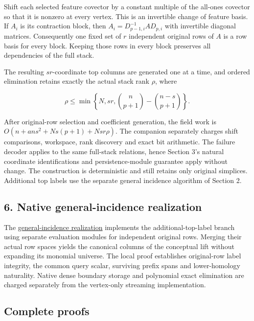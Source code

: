 Shift each selected feature covector by a constant multiple of the all-ones covector so that it is nonzero at every vertex. This is an invertible change of feature basis. If \(A_i\) is its contraction block, then \(A_i=D_{p-1,i}^{-1}AD_{p,i}\) with invertible diagonal matrices. Consequently one fixed set of \(r\) independent original rows of \(A\) is a row basis for every block. Keeping those rows in every block preserves all dependencies of the full stack.

The resulting \(sr\)-coordinate top columns are generated one at a time, and ordered elimination retains exactly the actual stack rank \(\rho\), where

\[
\rho\leq\min\left\{N,sr,
\binom{n}{p+1}-\binom{n-s}{p+1}\right\}.
\]

After original-row selection and coefficient generation, the field work is \(O(n+ans^2+Ns(p+1)+Nsr\rho)\). The companion separately charges shift comparisons, workspace, rank discovery and exact bit arithmetic. The failure decoder applies to the same full-stack relations, hence Section 3's natural coordinate identifications and persistence-module guarantee apply without change. The construction is deterministic and still retains only original simplices. Additional top labels use the separate general incidence algorithm of Section 2.

\hypertarget{af-ca17aac320-native-general-incidence-realization}{%
\subsection{6. Native general-incidence realization}\label{af-ca17aac320-native-general-incidence-realization}}

The \href{https://github.com/icekylinx/algorithm-frontier/blob/main/problems/persistence-failure-certificates/incidence-realization.md}{general-incidence realization} implements the additional-top-label branch using separate evaluation modules for independent original rows. Merging their actual row spaces yields the canonical columns of the conceptual lift without expanding its monomial universe. The local proof establishes original-row label integrity, the common query scalar, surviving prefix spans and lower-homology naturality. Native dense boundary storage and polynomial exact elimination are charged separately from the vertex-only streaming implementation.

\hypertarget{af-ca17aac320-complete-proofs}{%
\subsection{Complete proofs}\label{af-ca17aac320-complete-proofs}}

